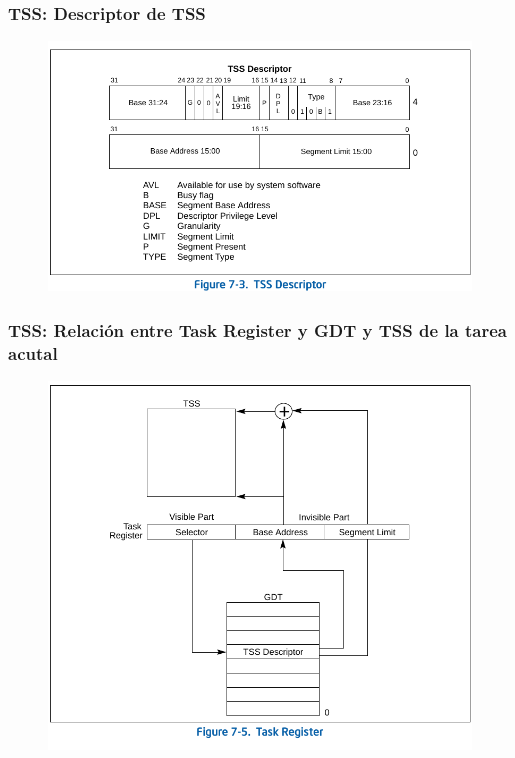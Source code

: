 \documentclass[aspectratio=169]{beamer}
\begin{document}
\begin{frame}
\frametitle{TSS: Descriptor de TSS}
\vspace{-0.4cm}
\begin{figure}[ht!]
	\centering
	\includegraphics[scale=0.8]{img/TSS_descriptor.pdf}
\end{figure}
\end{frame}

\begin{frame}
\frametitle{TSS: Relación entre Task Register y GDT y TSS de la tarea acutal}
\vspace{-0.1cm}
\begin{figure}[ht!]
	\centering
	\includegraphics[scale=0.7]{img/Task_Register_ref.pdf}
\end{figure}
\end{frame}
\end{document}
